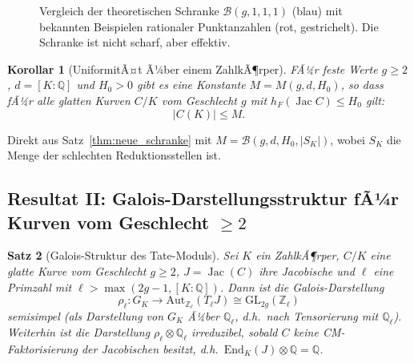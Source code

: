 ﻿\documentclass[12pt,a4paper]{article}
\theoremstyle{plain}
\newtheorem{theorem}{Satz}[section]
\newtheorem{corollary}[theorem]{Korollar}
\theoremstyle{definition}
\theoremstyle{remark}
\newenvironment{proof*}[1][Beweis]{%
  \begin{proof}[#1]\renewcommand{\qedsymbol}{$\blacksquare$}}
  {\end{proof}}
\newcommand{\Q}{\mathbb{Q}}
\newcommand{\Z}{\mathbb{Z}}
\newcommand{\End}{\mathrm{End}}
\DeclareMathOperator{\Jac}{Jac}
\begin{document}
\begin{figure}[H]
\centering
{}
\caption{Vergleich der theoretischen Schranke $\mathcal B(g,1,1,1)$ (blau) mit
  bekannten Beispielen rationaler Punktanzahlen (rot, gestrichelt).
  Die Schranke ist nicht scharf, aber effektiv.}
\label{fig:schranke}
\end{figure}

\begin{corollary}[UniformitÃ¤t Ã¼ber einem ZahlkÃ¶rper]\label{cor:uniform}
FÃ¼r feste Werte $g \geq 2$, $d = [K:\Q]$ und $H_0 > 0$ gibt es eine Konstante
$M = M(g,d,H_0)$, so dass fÃ¼r alle glatten Kurven $C/K$ vom Geschlecht $g$
mit $h_F(\Jac C) \leq H_0$ gilt:
\[
  |C(K)| \leq M.
\]
\end{corollary}

\begin{proof*}
Direkt aus Satz~\ref{thm:neue_schranke} mit $M = \mathcal{B}(g,d,H_0,|S_K|)$,
wobei $S_K$ die Menge der schlechten Reduktionsstellen ist.
\end{proof*}

\subsection{Resultat II: Galois-Darstellungsstruktur fÃ¼r Kurven vom Geschlecht $\geq 2$}

\begin{theorem}[Galois-Struktur des Tate-Moduls]\label{thm:galois_struktur}
Sei $K$ ein ZahlkÃ¶rper, $C/K$ eine glatte Kurve vom Geschlecht $g \geq 2$,
$J = \Jac(C)$ ihre Jacobische und $\ell$ eine Primzahl mit
$\ell > \max(2g-1, [K:\Q])$. Dann ist die Galois-Darstellung
\[
  \rho_\ell: G_K \longrightarrow \mathrm{Aut}_{\Z_\ell}(T_\ell J) \cong \mathrm{GL}_{2g}(\Z_\ell)
\]
\emph{semisimpel} (als Darstellung von $G_K$ Ã¼ber $\Q_\ell$, d.h.\ nach Tensorierung mit $\Q_\ell$).
Weiterhin ist die Darstellung $\rho_\ell \otimes \Q_\ell$ irreduzibel, sobald $C$ keine
\emph{CM-Faktorisierung} der Jacobischen besitzt, d.h.\ $\End_K(J) \otimes \Q = \Q$.
\end{theorem}
\end{document}
